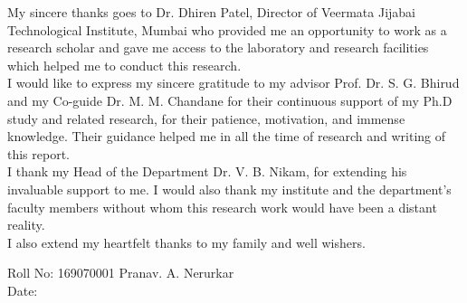 

\begin{acknowledgements}      %

\hspace{0.06in}My sincere thanks goes to Dr. Dhiren Patel, Director of Veermata Jijabai Technological Institute, Mumbai who provided me an opportunity to work as a research scholar and gave me access to the laboratory and research facilities which helped me to conduct this research.\\

I would like to express my sincere gratitude to my advisor Prof. Dr. S. G. Bhirud and my Co-guide Dr. M. M. Chandane for their continuous support of my Ph.D study and related research, for their patience, motivation, and immense knowledge. Their guidance helped me in all the time of research and writing of this report. \\

 

I thank my Head of the Department Dr. V. B. Nikam,  for extending his invaluable support to me. I would also thank my institute and the department's faculty members without whom this research work would have been a distant reality. \\

I also extend my heartfelt thanks to my family and well wishers. 


\vspace{4cm}

Roll No: 169070001 \hspace{5cm}Pranav. A. Nerurkar		\\			
Date:	











































\end{acknowledgements}
